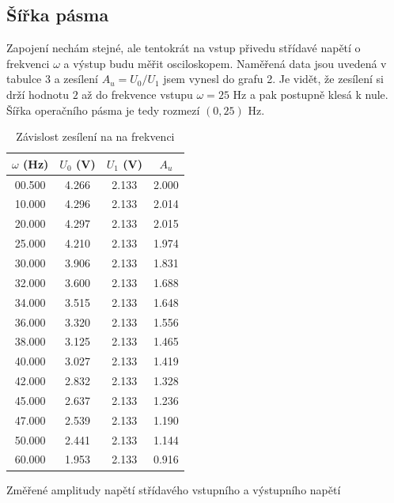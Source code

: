 \documentclass[a4paper,11pt]{article}
\begin{document}
\subsection{Šířka pásma}

Zapojení nechám stejné, ale tentokrát na vstup přivedu střídavé napětí o frekvenci $ \omega $ a výstup budu měřit osciloskopem. Naměřená data jsou uvedená v tabulce 3 a zesílení $ A_u = U_0 / U_1 $ jsem vynesl do grafu 2. Je vidět, že zesílení si drží hodnotu $ 2 $ až do frekvence vstupu $ \omega = 25 $ Hz a pak postupně klesá k nule. Šířka operačního pásma je tedy rozmezí $ (0, 25) $ Hz. 

\newpage

\begin{table}[htpb]
    \begin{minipage}{.45\linewidth}
        \centering
        \begin{tabular}{| c c c c |}
            \hline
            $ \omega $  (Hz) & $ U_0 $ (V) & $ U_1 $ (V) & $ A_u $  \\
            \hline
            00.500 & 4.266 & 2.133 & 2.000 \\
            10.000 & 4.296 & 2.133 & 2.014 \\
            20.000 & 4.297 & 2.133 & 2.015 \\
            25.000 & 4.210 & 2.133 & 1.974 \\
            30.000 & 3.906 & 2.133 & 1.831 \\
            32.000 & 3.600 & 2.133 & 1.688 \\
            34.000 & 3.515 & 2.133 & 1.648 \\
            36.000 & 3.320 & 2.133 & 1.556 \\
            38.000 & 3.125 & 2.133 & 1.465 \\
            40.000 & 3.027 & 2.133 & 1.419 \\
            42.000 & 2.832 & 2.133 & 1.328 \\
            45.000 & 2.637 & 2.133 & 1.236 \\
            47.000 & 2.539 & 2.133 & 1.190 \\
            50.000 & 2.441 & 2.133 & 1.144 \\
            60.000 & 1.953 & 2.133 & 0.916 \\
            \hline
        \end{tabular}
        \caption{Změřené amplitudy napětí střídavého vstupního a výstupního napětí}
    \end{minipage} 
    \hfill
    \begin{minipage}{.45\linewidth}
        \centering
        \resizebox{\textwidth}{!}{  }
        \captionsetup{type=graph}
        \caption{Závislost zesílení na na frekvenci }
    \end{minipage} 
\end{table}
\end{document}
